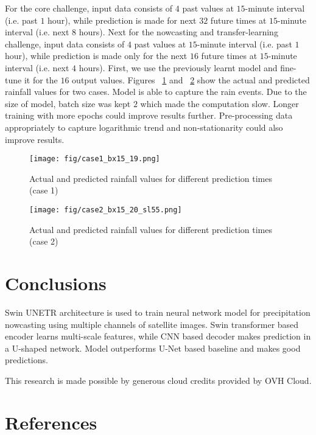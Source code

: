 \documentclass{article}
\begin{document}
For the core challenge, input data consists of $4$ past values at $15$-minute interval (i.e. past $1$ hour), while prediction is made for next $32$ future times at $15$-minute interval (i.e. next $8$ hours). Next for the nowcasting and transfer-learning challenge, input data consists of $4$ past values at $15$-minute interval (i.e. past $1$ hour), while prediction is made only for the next $16$ future times at $15$-minute interval (i.e. next $4$ hours). First, we use the previously learnt model and fine-tune it for the $16$ output values. Figures ~\ref{case1} and ~\ref{case2} show the actual and predicted rainfall values for two cases. Model is able to capture the rain events. Due to the size of model, batch size was kept $2$ which made the computation slow. Longer training with more epochs could improve results further. Pre-processing data appropriately to capture logarithmic trend and non-stationarity could also improve results.

\begin{figure}
  \centering
  \texttt{[image: fig/case1\_bx15\_19.png]}
  \caption{Actual and predicted rainfall values for different prediction times (case 1)}
  \label{case1}
\end{figure}

\begin{figure}
  \centering
  \texttt{[image: fig/case2\_bx15\_20\_sl55.png]}
  \caption{Actual and predicted rainfall values for different prediction times (case 2)}
  \label{case2}
\end{figure}

\section{Conclusions}

Swin UNETR architecture is used to train neural network model for precipitation nowcasting using multiple channels of satellite images. Swin transformer based encoder learns multi-scale features, while CNN based decoder makes prediction in a U-shaped network. Model outperforms U-Net based baseline and makes good predictions.

\begin{ack}
This research is made possible by generous cloud credits provided by OVH Cloud.
\end{ack}

\section*{References}
\end{document}
